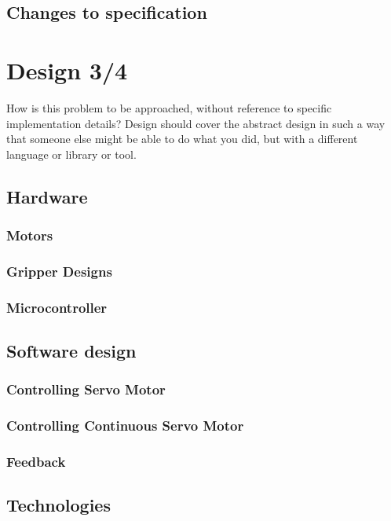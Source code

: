 \documentclass{l4proj}
\begin{document}
\section{Changes to specification}


\chapter{Design 3/4}
How is this problem to be approached, without reference to specific implementation details? 
Design should cover the abstract design in such a way that someone else might be able to do what you did, but with a different language or library or tool.

\section{Hardware}
\subsection{Motors}
\subsection{Gripper Designs}
\subsection{Microcontroller}

\section{Software design}
\subsection{Controlling Servo Motor}
\subsection{Controlling Continuous Servo Motor}
\subsection{Feedback}

\section{Technologies}
\end{document}
